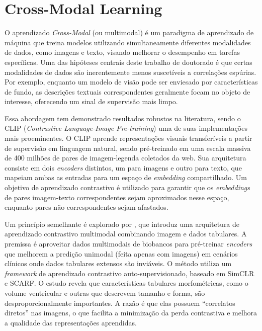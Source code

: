\section{Cross-Modal Learning}

O aprendizado \textit{Cross-Modal} (ou multimodal) é um paradigma de aprendizado de máquina que treina modelos utilizando simultaneamente diferentes modalidades de dados, como imagens e texto, visando melhorar o desempenho em tarefas específicas. Uma das hipóteses centrais deste trabalho de doutorado é que certas modalidades de dados são inerentemente menos suscetíveis a correlações espúrias. Por exemplo, enquanto um modelo de visão pode ser enviesado por características de fundo, as descrições textuais correspondentes geralmente focam no objeto de interesse, oferecendo um sinal de supervisão mais limpo.

Essa abordagem tem demonstrado resultados robustos na literatura, sendo o CLIP (\textit{Contrastive Language-Image Pre-training}) \cite{clip} uma de suas implementações mais proeminentes. O CLIP aprende representações visuais transferíveis a partir de supervisão em linguagem natural, sendo pré-treinado em uma escala massiva de 400 milhões de pares de imagem-legenda coletados da web. Sua arquitetura consiste em dois \textit{encoders} distintos, um para imagens e outro para texto, que mapeiam ambas as entradas para um espaço de \textit{embedding} compartilhado. Um objetivo de aprendizado contrastivo é utilizado para garantir que os \textit{embeddings} de pares imagem-texto correspondentes sejam aproximados nesse espaço, enquanto pares não correspondentes sejam afastados.

Um princípio semelhante é explorado por \cite{hager2023best}, que introduz uma arquitetura de aprendizado contrastivo multimodal combinando imagem e dados tabulares. A premissa é aproveitar dados multimodais de biobancos para pré-treinar \textit{encoders} que melhorem a predição unimodal (feita apenas com imagens) em cenários clínicos onde dados tabulares extensos são inviáveis. O método utiliza um \textit{framework} de aprendizado contrastivo auto-supervisionado, baseado em SimCLR e SCARF. O estudo revela que características tabulares morfométricas, como o volume ventricular e outras que descrevem tamanho e forma, são desproporcionalmente importantes. A razão é que elas possuem ``correlatos diretos'' nas imagens, o que facilita a minimização da perda contrastiva e melhora a qualidade das representações aprendidas.

